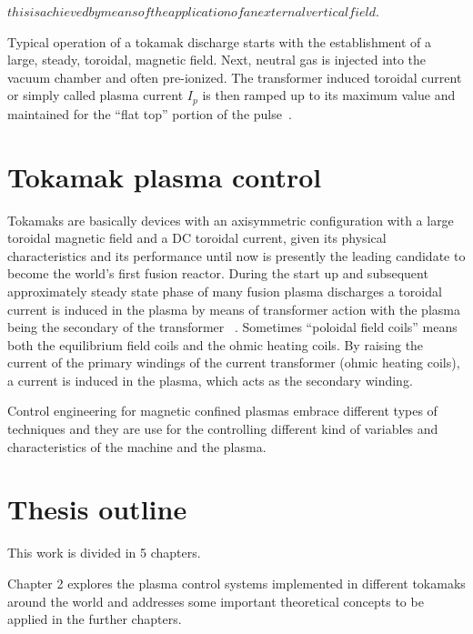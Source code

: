 $this is achieved by means of the application of an external vertical field.$




Typical operation of a tokamak discharge starts with the establishment of a large, steady, toroidal, magnetic field. Next, neutral gas is injected into the vacuum chamber and often pre-ionized. The transformer induced toroidal current or simply called plasma current $I_p$ is then ramped up to its maximum value and maintained for the “flat top” portion of the pulse~\cite[Chapter~13]{Freidberg2007}.

\section{Tokamak plasma control}

Tokamaks are basically devices with an axisymmetric configuration with a large toroidal magnetic field and a DC toroidal current, given its physical characteristics and its performance until now is presently the leading candidate to become the world’s first fusion reactor. During the start up and subsequent approximately steady state phase of many fusion plasma discharges a toroidal current is induced in the plasma by means of transformer action with the plasma being the secondary of the transformer  ~\cite[Chapter~9]{Freidberg2007}. Sometimes “poloidal field coils” means both the equilibrium field coils and the ohmic heating coils. By raising the current of the primary windings of the current transformer (ohmic heating coils), a current is induced in the plasma, which acts as the secondary winding. \smallskip

Control engineering for magnetic confined plasmas  embrace different types of techniques and they are use for the controlling different kind of variables and characteristics of the machine and the plasma.\smallskip  


\section{Thesis outline}

This work is divided in 5 chapters.

Chapter 2 explores the plasma control systems implemented in different tokamaks around the world and addresses some important theoretical concepts to be applied in the further chapters.\smallskip